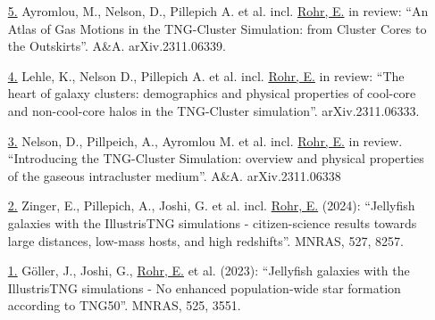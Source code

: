 \documentclass[a4paper,10pt,oneside]{article}
\begin{document}
\begin{enumerate}[wide, labelwidth=!, labelindent=-11pt, parsep=0pt]
    \item[\href{https://ui.adsabs.harvard.edu/abs/2023arXiv231106339A/abstract}{5.}] Ayromlou, M., Nelson, D., Pillepich A. et al. incl. \underline{Rohr, E.} in review: ``An Atlas of Gas Motions in the TNG-Cluster Simulation: from Cluster Cores to the Outskirts''. A\&A. arXiv.2311.06339.
    \item[\href{https://ui.adsabs.harvard.edu/abs/2023arXiv231106333L/abstract}{4.}] Lehle, K., Nelson D., Pillepich A. et al. incl. \underline{Rohr, E.} in review: ``The heart of galaxy clusters: demographics and physical properties of cool-core and non-cool-core halos in the TNG-Cluster simulation''. arXiv.2311.06333.
    \item[\href{https://ui.adsabs.harvard.edu/abs/2023arXiv231106338N/abstract}{3.}] Nelson, D., Pillpeich, A., Ayromlou M. et al. incl. \underline{Rohr, E.} in review. ``Introducing the TNG-Cluster Simulation: overview and physical properties of the gaseous intracluster medium''. A\&A. arXiv.2311.06338
    \item[\href{https://ui.adsabs.harvard.edu/abs/2024MNRAS.527.8257Z/abstract}{2.}] Zinger, E., Pillepich, A., Joshi, G. et al. incl. \underline{Rohr, E.} (2024): ``Jellyfish galaxies with the IllustrisTNG simulations - citizen-science results towards large distances, low-mass hosts, and high redshifts''. MNRAS, 527, 8257.
    \item[\href{https://ui.adsabs.harvard.edu/abs/2023MNRAS.525.3551G/abstract}{1.}] G{\"o}ller, J., Joshi, G., \underline{Rohr, E.} et al. (2023): ``Jellyfish galaxies with the IllustrisTNG simulations - No enhanced population-wide star formation according to TNG50''. MNRAS, 525, 3551.
\end{enumerate}


\noindent{}
\end{document}

